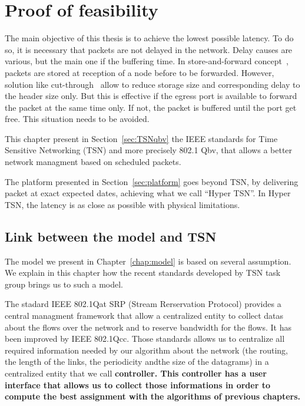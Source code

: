 
\chapter{Proof of feasibility}
\label{chap:TSN}
\minitoc
The main objective of this thesis is to achieve the lowest possible latency. To do so, it is necessary that packets are not delayed in the network. Delay causes are various, but the main one if the buffering time. In store-and-forward concept~\cite{tindell1992store}, packets are stored at reception of a node before to be forwarded. However, solution like cut-through~\cite{kermani1979virtual} allow to reduce storage size and corresponding delay to the header size only. But this is effective if the egress port is available to forward the packet at the same time only. If not, the packet is buffered until the port get free. This situation needs to be avoided.

This chapter present in Section~\ref{sec:TSNqbv} the IEEE standards for Time Sensitive Networking (TSN) and more precisely 802.1 Qbv, that allows a better network managment based on scheduled packets. 

The platform presented in Section~\ref{sec:platform} goes beyond TSN, by delivering packet at exact expected dates, achieving what we call “Hyper TSN”. In Hyper TSN, the latency is as close as possible with physical limitations.


\section{Link between the model and TSN}

The model we present in Chapter~\ref{chap:model} is based on several assumption. We explain in this chapter how the recent standards developed by TSN task group brings us to such a model.



The stadard IEEE 802.1Qat SRP (Stream Rerservation Protocol) provides a central managment framework that allow a centralized entity to collect datas about the flows over the network and to reserve bandwidth for the flows. It has been improved by IEEE 802.1Qcc. Those standards allows us to centralize all required information needed by our algorithm about the network (the routing, the length of the links, the periodicity andthe size of the datagrams) in a centralized entity that we call \bf{controller}. This controller has a user interface that allows us to collect those informations in order to compute the best assignment with the algorithms of previous chapters.



